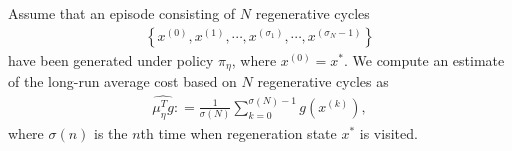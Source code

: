 \documentclass[11pt]{article}
\newcommand{\E}{\mathbb{E}}
\theoremstyle{definition}
\numberwithin{equation}{section}
\begin{document}
Assume that an episode consisting  of $N$ regenerative cycles
\begin{align*}
  \left\{x^{(0)}, x^{(1)},\cdots, x^{(\sigma_1)},\cdots,   x^{(\sigma_{N}-1)}   \right \}
\end{align*}
have been generated  under policy $\pi_\eta$, where $x^{(0)}=x^*.$
%
%		
%		
%		
%		
%		
We compute an estimate of the long-run average cost based on   $N$ regenerative cycles  as
\begin{align}\label{es_av}
\widehat{\mu^T_\eta  g}  : =\frac{1}{\sigma(N)}  \sum\limits_{k=0}^{\sigma(N)-1} g(x^{(k)}),
\end{align}
where $\sigma(n)$ is the $n$th time when  regeneration state $x^*$ is visited.
\end{document}
